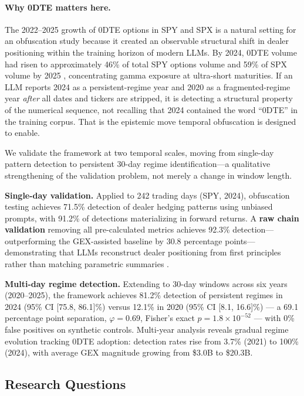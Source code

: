 \paragraph{Why 0DTE matters here.}
The 2022--2025 growth of 0DTE options in SPY and SPX is a natural setting for an obfuscation study because it created an observable structural shift in dealer positioning within the training horizon of modern LLMs. By 2024, 0DTE volume had risen to approximately 46\% of total SPY options volume and 59\% of SPX volume by 2025 \citep{cboe2024zero,cboe2025spx0dte,dim2023odtes,adams2025zerodte}, concentrating gamma exposure at ultra-short maturities. If an LLM reports 2024 as a persistent-regime year and 2020 as a fragmented-regime year \emph{after} all dates and tickers are stripped, it is detecting a structural property of the numerical sequence, not recalling that 2024 contained the word ``0DTE'' in the training corpus. That is the epistemic move temporal obfuscation is designed to enable.

We validate the framework at two temporal scales, moving from single-day pattern detection to persistent 30-day regime identification---a qualitative strengthening of the validation problem, not merely a change in window length.

\textbf{Single-day validation.} Applied to 242 trading days (SPY, 2024), obfuscation testing achieves 71.5\% detection of dealer hedging patterns using unbiased prompts, with 91.2\% of detections materializing in forward returns. A \textbf{raw chain validation} removing all pre-calculated metrics achieves 92.3\% detection---outperforming the GEX-assisted baseline by 30.8 percentage points---demonstrating that LLMs reconstruct dealer positioning from first principles rather than matching parametric summaries \citep{regan2025obfuscation}.

\textbf{Multi-day regime detection.} Extending to 30-day windows across six years (2020--2025), the framework achieves 81.2\% detection of persistent regimes in 2024 (95\% CI [75.8, 86.1]\%) versus 12.1\% in 2020 (95\% CI [8.1, 16.6]\%) --- a 69.1 percentage point separation, $\varphi = 0.69$, Fisher's exact $p = 1.8 \times 10^{-52}$ --- with 0\% false positives on synthetic controls. Multi-year analysis reveals gradual regime evolution tracking 0DTE adoption: detection rates rise from 3.7\% (2021) to 100\% (2024), with average GEX magnitude growing from \$3.0B to \$20.3B.

\subsection{Research Questions}


